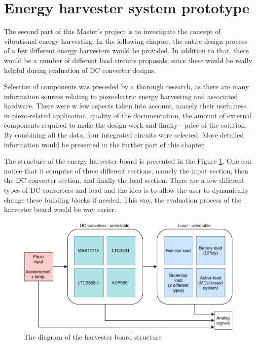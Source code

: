 \documentclass[12pt,a4paper]{article}
\begin{document}
\FloatBarrier

\section{Energy harvester system prototype}
The second part of this Master's project is to investigate the concept of vibrational energy harvesting. In the following chapter, the entire design process of a few different energy harvesters would be provided. In addition to that, there would be a number of different load circuits proposals, since these would be really helpful during evaluation of DC converter designs.
\par
Selection of components was preceded by a thorough research, as there are many information sources relating to piezoelectric energy harvesting and associated hardware. There were w few aspects taken into account, namely their usefulness in piezo-related application, quality of the documentation, the amount of external components required to make the design work and finally - price of the solution. By combining all the data, four integrated circuits were selected. More detailed information would be presented in the further part of this chapter.
\par
The structure of the energy harvester board is presented in the Figure \ref{fig:harvesterdiagram}. One can notice that it comprise of three different sections, namely the input section, then the DC converter section, and finally the load section. There are a few different types of DC converters and load and the idea is to allow the user to dynamically change these building blocks if needed. This way, the evaluation process of the harvester board would be way easier.\par

\begin{figure}[ht!]
\includegraphics[scale=0.9]{harvesterdiagram.pdf}
\caption{The diagram of the harvester board structure}
\label{fig:harvesterdiagram}
\end{figure}
\end{document}
